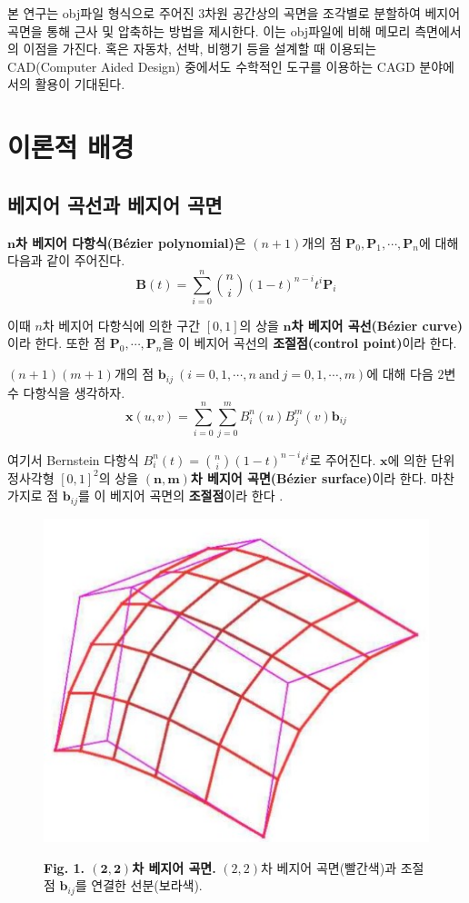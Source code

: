 \documentclass{Humantech_Paper_Awardfullpaper_hutech}
\begin{document}
본 연구는 obj파일 형식으로 주어진 3차원 공간상의 곡면을 조각별로 분할하여 베지어 곡면을 통해 근사 및 압축하는 방법을 제시한다. 이는 obj파일에 비해 메모리 측면에서의 이점을 가진다. 혹은 자동차, 선박, 비행기 등을 설계할 때 이용되는 CAD(Computer Aided Design) 중에서도 수학적인 도구를 이용하는 CAGD 분야에서의 활용이 기대된다. 
	
\section{이론적 배경}
\subsection{베지어 곡선과 베지어 곡면}
\begin{defn}
	\textbf{$\bm{n}$차 베지어 다항식(Bézier polynomial)}은 $(n+1)$개의 점 $\mathbf{P}_0, \mathbf{P}_1, \cdots, \mathbf{P}_n$에 대해 다음과 같이 주어진다.
	\begin{equation} \label{BezierCurve}
		\mathbf{B}(t)=\sum_{i=0}^n \binom ni(1-t)^{n-i}t^i\mathbf{P}_i
	\end{equation}
	
	\noindent 이때 $n$차 베지어 다항식에 의한 구간 $[0, 1]$의 상을 \textbf{$\boldsymbol{n}$차 베지어 곡선(Bézier curve)}이라 한다. 또한 점 $\mathbf{P}_0, \cdots, \mathbf{P}_n$을 이 베지어 곡선의 \textbf{조절점(control point)}이라 한다. 
\end{defn}

\begin{defn}
	$(n+1)(m+1)$개의 점 $\mathbf{b}_{ij}\ (i = 0, 1, \cdots, n \ \text{and} \ j = 0, 1, \cdots, m)$에 대해 다음 $2$변수 다항식을 생각하자. 
	\begin{equation} \label{BezierSurface}
		\mathbf{x}(u, v)=\sum_{i=0}^n\sum_{j=0}^m B_i^n(u)B_j^m(v)\mathbf{b}_{ij} 
	\end{equation}

	여기서 Bernstein 다항식 $B_i^n(t)=\binom ni(1-t)^{n-i}t^i$로 주어진다. $\mathbf{x}$에 의한 단위 정사각형 $[0, 1]^2$의 상을 \textbf{$\bm{(n, m)}$차 베지어 곡면(Bézier surface)}이라 한다. 마찬가지로 점 $\mathbf{b}_{ij}$를 이 베지어 곡면의 \textbf{조절점}이라 한다 \cite{Farin}.
\end{defn}

\begin{figure}[h]
	\begin{center}
		\includegraphics[width=.25\textwidth]{BezierSurface}
	\end{center} 
	\raggedright \small \textbf{Fig. 1. $\bm{(2, 2)}$차 베지어 곡면.} $(2, 2)$차 베지어 곡면(빨간색)과 조절점 $\mathbf{b}_{ij}$를 연결한 선분(보라색).
\end{figure}
\end{document}
